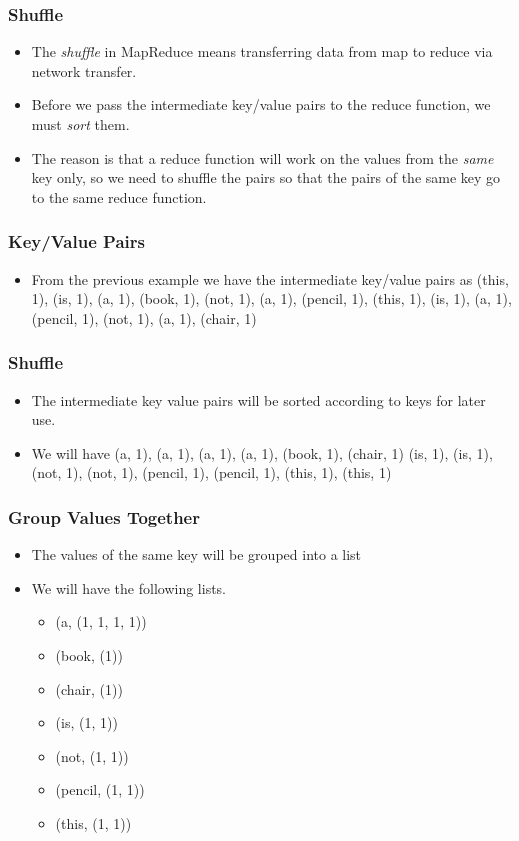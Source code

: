 \documentclass{beamer}
\begin{document}
\begin{frame}
  \frametitle{Shuffle}
  \begin{itemize}
    \item The {\em shuffle} in MapReduce means transferring data from
      map to reduce via network transfer.
    \item Before we pass the intermediate key/value pairs to the
      reduce function, we must {\em sort} them.
    \item The reason is that a reduce function will work on the values
      from the {\em same} key only, so we need to shuffle the pairs so
      that the pairs of the same key go to the same reduce function.
  \end{itemize}
\end{frame}

\begin{frame}
  \frametitle{Key/Value Pairs}
  \begin{itemize}
    \item From the previous example we have the intermediate key/value
      pairs as (this, 1), (is, 1), (a, 1), (book, 1), (not, 1),
      (a, 1), (pencil, 1), (this, 1), (is, 1), (a, 1), (pencil, 1),
      (not, 1), (a, 1), (chair, 1)
  \end{itemize}
\end{frame}

\begin{frame}
  \frametitle{Shuffle}
  \begin{itemize}
    \item The intermediate key value pairs will be sorted according to
      keys for later use.
    \item We will have (a, 1), (a, 1), (a, 1), (a, 1), (book, 1),
      (chair, 1) (is, 1), (is, 1), (not, 1), (not, 1), (pencil, 1),
      (pencil, 1), (this, 1), (this, 1)
  \end{itemize}
\end{frame}

\begin{frame}
  \frametitle{Group Values Together}
  \begin{itemize}
    \item The values of the same key will be grouped into a list
    \item We will have the following lists.
      \begin{itemize}
        \item (a, (1, 1, 1, 1))
        \item (book, (1))
        \item (chair, (1))
        \item (is, (1, 1))
        \item (not, (1, 1))
        \item (pencil, (1, 1))
        \item (this, (1, 1))
      \end{itemize}
  \end{itemize}
\end{frame}
\end{document}
